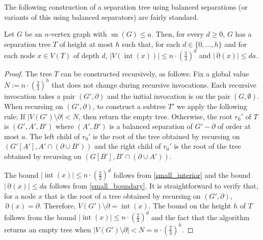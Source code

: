 \documentclass{patmorin}
\newcommand{\pat}[1]{\textcolor{Blue}{[Pat: #1]}}
\DeclareMathOperator{\sep}{sn}
\DeclareMathOperator{\interior}{int}
\DeclareMathOperator{\boundary}{\partial}
\begin{document}

The following construction of a separation tree using balanced separations (or variants of this using balanced separators) are fairly standard.

\begin{lem}\label{separation_tree}
  Let $G$ be an $n$-vertex graph with $\sep(G)\le a$.  Then, for every $d\ge 0$, $G$ has a separation tree $T$ of height at most $h$ such that, for each $d\in\{0,\ldots,h\}$ and for each node $x\in V(T)$ of depth $d$, $|V(\interior(x))|\le n\cdot (\tfrac{2}{3})^d$ and $|\boundary(x)|\le da$.
\end{lem}

\begin{proof}
  The tree $T$ can be constructed recursively, as follows:  Fix a global value $N:=n\cdot(\tfrac{2}{3})^h$ that does not change during recursive invocations. Each recursive invocation takes a pair $(G',\partial)$ and the initial invocation is on the pair $(G,\emptyset)$.  When recursing on $(G',\partial)$, to construct a subtree $T'$ we apply the following rule:  If $|V(G')\setminus\partial|< N$, then return the empty tree. Otherwise, the root $r_0'$ of $T$ is $(G',A',B')$ where $(A',B')$ is a balanced separation of $G'-\partial$ of order at most $a$. The left child of $r_0'$ is the root of the tree obtained by recursing on $(G'[A'],A'\cap(\partial\cup B'))$ and the right child of $r_0'$ is the root of the tree obtained by recursing on $(G[B'],B'\cap(\partial\cup A'))$.

  The bound $|\interior(x)|\le n\cdot (\tfrac{2}{3})^d$ follows from \ref{small_interior} and the bound $|\boundary(x)|\le da$ follows from \ref{small_boundary}.
  It is straightforward to verify that, for a node $x$ that is the root of a tree obtained by recursing on $(G',\partial)$, $\boundary(x)=\partial$. Therefore, $V(G')\setminus\partial=\interior(x)$.
  The bound on the height $h$ of $T$ follows from the bound $|\interior(x)|\le n\cdot (\tfrac{2}{3})^d$ and the fact that the algorithm returns an empty tree when $|V(G')\setminus\partial|<N=n\cdot(\tfrac{2}{3})^h$.
\end{proof}






\end{document}
